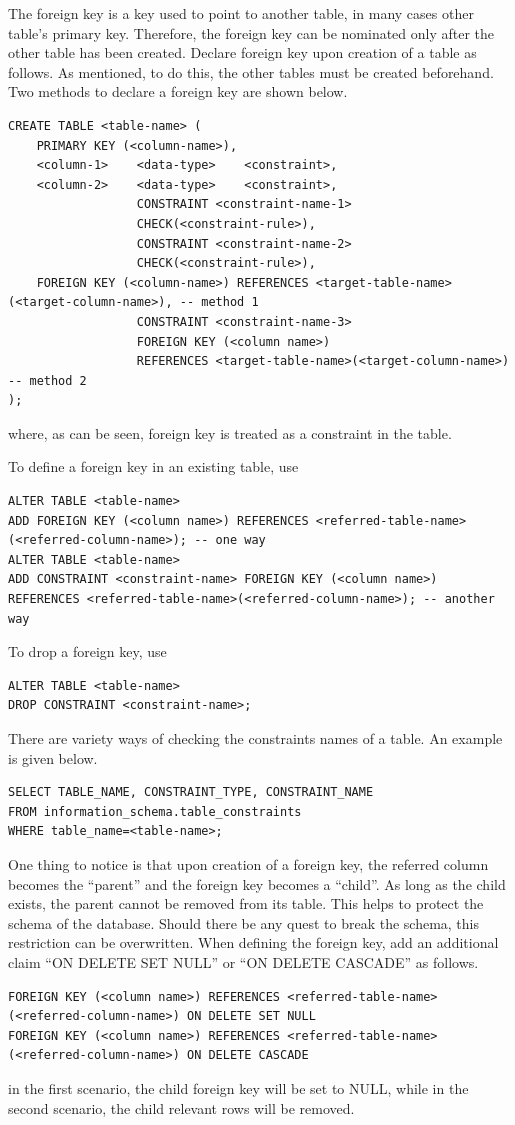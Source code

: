 The foreign key is a key used to point to another table, in many cases other table's primary key. Therefore, the foreign key can be nominated only after the other table has been created. Declare foreign key upon creation of a table as follows. As mentioned, to do this, the other tables must be created beforehand. Two methods to declare a foreign key are shown below.
\begin{lstlisting}
CREATE TABLE <table-name> (
    PRIMARY KEY (<column-name>),
    <column-1>    <data-type>    <constraint>,
    <column-2>    <data-type>    <constraint>,
                  CONSTRAINT <constraint-name-1>
                  CHECK(<constraint-rule>),
                  CONSTRAINT <constraint-name-2>
                  CHECK(<constraint-rule>),
    FOREIGN KEY (<column-name>) REFERENCES <target-table-name>(<target-column-name>), -- method 1
                  CONSTRAINT <constraint-name-3>
                  FOREIGN KEY (<column name>)
                  REFERENCES <target-table-name>(<target-column-name>) -- method 2
);
\end{lstlisting}
where, as can be seen, foreign key is treated as a constraint in the table.

To define a foreign key in an existing table, use
\begin{lstlisting}
ALTER TABLE <table-name>
ADD FOREIGN KEY (<column name>) REFERENCES <referred-table-name>(<referred-column-name>); -- one way
ALTER TABLE <table-name>
ADD CONSTRAINT <constraint-name> FOREIGN KEY (<column name>) REFERENCES <referred-table-name>(<referred-column-name>); -- another way
\end{lstlisting}
To drop a foreign key, use
\begin{lstlisting}
ALTER TABLE <table-name>
DROP CONSTRAINT <constraint-name>;
\end{lstlisting}

There are variety ways of checking the constraints names of a table. An example is given below.
\begin{lstlisting}
SELECT TABLE_NAME, CONSTRAINT_TYPE, CONSTRAINT_NAME
FROM information_schema.table_constraints
WHERE table_name=<table-name>;
\end{lstlisting}

One thing to notice is that upon creation of a foreign key, the referred column becomes the ``parent'' and the foreign key becomes a ``child''. As long as the child exists, the parent cannot be removed from its table. This helps to protect the schema of the database. Should there be any quest to break the schema, this restriction can be overwritten. When defining the foreign key, add an additional claim ``ON DELETE SET NULL'' or ``ON DELETE CASCADE'' as follows.
\begin{lstlisting}
FOREIGN KEY (<column name>) REFERENCES <referred-table-name>(<referred-column-name>) ON DELETE SET NULL
FOREIGN KEY (<column name>) REFERENCES <referred-table-name>(<referred-column-name>) ON DELETE CASCADE
\end{lstlisting}
in the first scenario, the child foreign key will be set to NULL, while in the second scenario, the child relevant rows will be removed.


